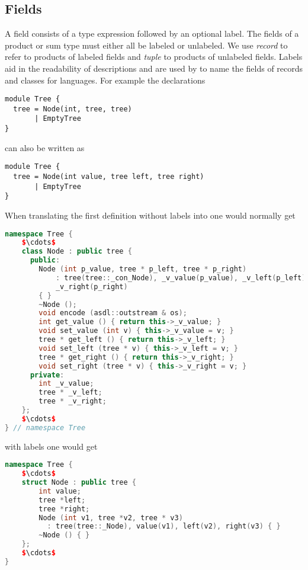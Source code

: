 \subsection{Fields}
A field consists of a type expression followed by an optional label.
The fields of a product or sum type must either all be labeled or unlabeled.
We use \emph{record} to refer to products of labeled fields and \emph{tuple}
to products of unlabeled fields.
Labels aid in the readability of
descriptions and are used by \asdlgen{} to name the fields of records
and classes for languages.
For example the declarations
\begin{code}\begin{lstlisting}[language=ASDL]
module Tree {
  tree = Node(int, tree, tree)
       | EmptyTree
}
\end{lstlisting}\end{code}%
can also be written as
\begin{code}\begin{lstlisting}[language=ASDL]
module Tree {
  tree = Node(int value, tree left, tree right)
       | EmptyTree
}
\end{lstlisting}\end{code}%

When translating the first definition without labels 
into \Cplusplus{} one would normally get
\begin{code}\begin{lstlisting}[language=c++,mathescape=true]
namespace Tree {
    $\cdots$
    class Node : public tree {
      public:
        Node (int p_value, tree * p_left, tree * p_right)
            : tree(tree::_con_Node), _v_value(p_value), _v_left(p_left),
            _v_right(p_right)
        { }
        ~Node ();
        void encode (asdl::outstream & os);
        int get_value () { return this->_v_value; }
        void set_value (int v) { this->_v_value = v; }
        tree * get_left () { return this->_v_left; }
        void set_left (tree * v) { this->_v_left = v; }
        tree * get_right () { return this->_v_right; }
        void set_right (tree * v) { this->_v_right = v; }
      private:
        int _v_value;
        tree * _v_left;
        tree * _v_right;
    };
    $\cdots$
} // namespace Tree
\end{lstlisting}\end{code}%
with labels one would get
\begin{code}\begin{lstlisting}[language=c++]
namespace Tree {
    $\cdots$
    struct Node : public tree {
        int value;
        tree *left;
        tree *right;
        Node (int v1, tree *v2, tree * v3)
          : tree(tree::_Node), value(v1), left(v2), right(v3) { }
        ~Node () { }
    };
    $\cdots$
}
\end{lstlisting}\end{code}%

